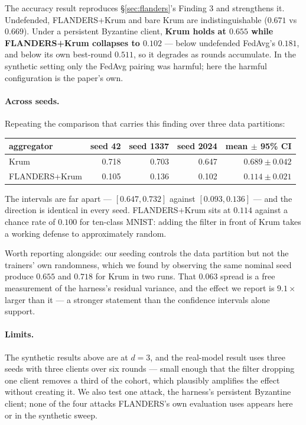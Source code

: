 \documentclass[11pt,a4paper]{article}
\begin{document}
The accuracy result reproduces \S\ref{sec:flanders}'s Finding 3 and
strengthens it. Undefended, FLANDERS+Krum and bare Krum are
indistinguishable ($0.671$ vs $0.669$). Under a persistent Byzantine
client, \textbf{Krum holds at $0.655$ while FLANDERS+Krum collapses to
$0.102$} --- below undefended FedAvg's $0.181$, and below its own
best-round $0.511$, so it degrades as rounds accumulate. In the
synthetic setting only the FedAvg pairing was harmful; here the harmful
configuration is the paper's own.

\paragraph{Across seeds.} Repeating the comparison that carries this
finding over three data partitions:

\begin{center}
\begin{tabular}{lrrrr}
\hline
aggregator & seed 42 & seed 1337 & seed 2024 & mean $\pm$ 95\% CI \\
\hline
Krum & 0.718 & 0.703 & 0.647 & $\mathbf{0.689 \pm 0.042}$ \\
FLANDERS+Krum & 0.105 & 0.136 & 0.102 & $\mathbf{0.114 \pm 0.021}$ \\
\hline
\end{tabular}
\end{center}

The intervals are far apart --- $[0.647, 0.732]$ against
$[0.093, 0.136]$ --- and the direction is identical in every seed.
FLANDERS+Krum sits at $0.114$ against a chance rate of $0.100$ for
ten-class MNIST: adding the filter in front of Krum takes a working
defense to approximately random.

Worth reporting alongside: our seeding controls the data partition but
not the trainers' own randomness, which we found by observing the same
nominal seed produce $0.655$ and $0.718$ for Krum in two runs. That
$0.063$ spread is a free measurement of the harness's residual variance,
and the effect we report is $9.1\times$ larger than it --- a stronger
statement than the confidence intervals alone support.

\paragraph{Limits.} The synthetic results above are at $d = 3$, and the
real-model result uses three seeds with three clients over six rounds ---
small enough that the filter dropping one client removes a third of the
cohort, which plausibly amplifies the effect without creating it. We
also test one attack, the harness's persistent Byzantine client; none of
the four attacks FLANDERS's own evaluation uses appears here or in the
synthetic sweep.
\end{document}

